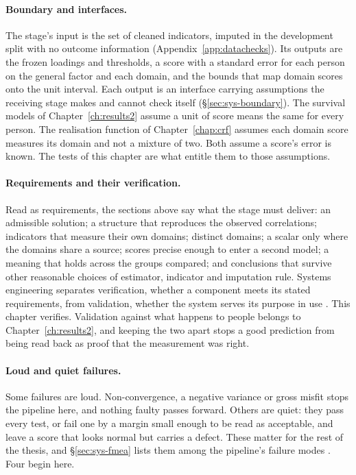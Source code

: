 \paragraph{Boundary and interfaces.} The stage's input is the set of cleaned indicators, imputed in the development split with no outcome information (Appendix~\ref{app:datachecks}). Its outputs are the frozen loadings and thresholds, a score with a standard error for each person on the general factor and each domain, and the bounds that map domain scores onto the unit interval. Each output is an interface carrying assumptions the receiving stage makes and cannot check itself (\S\ref{sec:sys-boundary}). The survival models of Chapter~\ref{ch:results2} assume a unit of score means the same for every person. The realisation function of Chapter~\ref{chap:crf} assumes each domain score measures its domain and not a mixture of two. Both assume a score's error is known. The tests of this chapter are what entitle them to those assumptions.

\paragraph{Requirements and their verification.} Read as requirements, the sections above say what the stage must deliver: an admissible solution; a structure that reproduces the observed correlations; indicators that measure their own domains; distinct domains; a scalar only where the domains share a source; scores precise enough to enter a second model; a meaning that holds across the groups compared; and conclusions that survive other reasonable choices of estimator, indicator and imputation rule. Systems engineering separates verification, whether a component meets its stated requirements, from validation, whether the system serves its purpose in use \citep{incose_2015}. This chapter verifies. Validation against what happens to people belongs to Chapter~\ref{ch:results2}, and keeping the two apart stops a good prediction from being read back as proof that the measurement was right.

\paragraph{Loud and quiet failures.} Some failures are loud. Non-convergence, a negative variance or gross misfit stops the pipeline here, and nothing faulty passes forward. Others are quiet: they pass every test, or fail one by a margin small enough to be read as acceptable, and leave a score that looks normal but carries a defect. These matter for the rest of the thesis, and \S\ref{sec:sys-fmea} lists them among the pipeline's failure modes \citep{stamatis_2003}. Four begin here.

